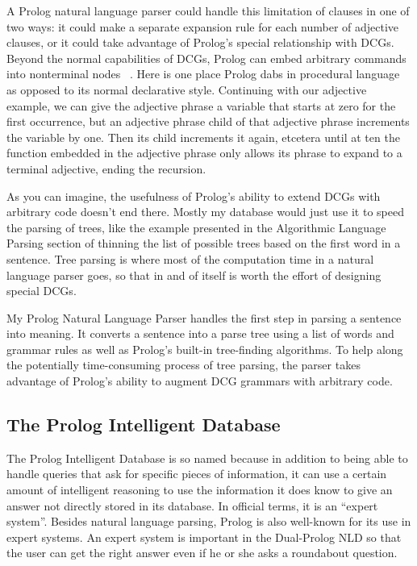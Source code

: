 \documentclass[12pt]{article}
\begin{document}
A Prolog natural language parser could handle this limitation of clauses in one of two ways: it could make a separate expansion rule for each number of adjective clauses, or it could take advantage of Prolog's special relationship with DCGs. Beyond the normal capabilities of DCGs, Prolog can embed arbitrary commands into nonterminal nodes ~\citep{PS}. Here is one place Prolog dabs in procedural language as opposed to its normal declarative style. Continuing with our adjective example, we can give the adjective phrase a variable that starts at zero for the first occurrence, but an adjective phrase child of that adjective phrase increments the variable by one. Then its child increments it again, etcetera until at ten the function embedded in the adjective phrase only allows its phrase to expand to a terminal adjective, ending the recursion. 

As you can imagine, the usefulness of Prolog's ability to extend DCGs with arbitrary code doesn't end there. Mostly my database would just use it to speed the parsing of trees, like the example presented in the Algorithmic Language Parsing section of thinning the list of possible trees based on the first word in a sentence. Tree parsing is where most of the computation time in a natural language parser goes, so that in and of itself is worth the effort of designing special DCGs.

My Prolog Natural Language Parser handles the first step in parsing a sentence into meaning. It converts a sentence into a parse tree using a list of words and grammar rules as well as Prolog's built-in tree-finding algorithms. To help along the potentially time-consuming process of tree parsing, the parser takes advantage of Prolog's ability to augment DCG grammars with arbitrary code.

\subsection*{The Prolog Intelligent Database}

The Prolog Intelligent Database is so named because in addition to being able to handle queries that ask for specific pieces of information, it can use a certain amount of intelligent reasoning to use the information it does know to give an answer not directly stored in its database. In official terms, it is an ``expert system''. Besides natural language parsing, Prolog is also well-known for its use in expert systems. An expert system is important in the Dual-Prolog NLD so that the user can get the right answer even if he or she asks a roundabout question.
\end{document}
